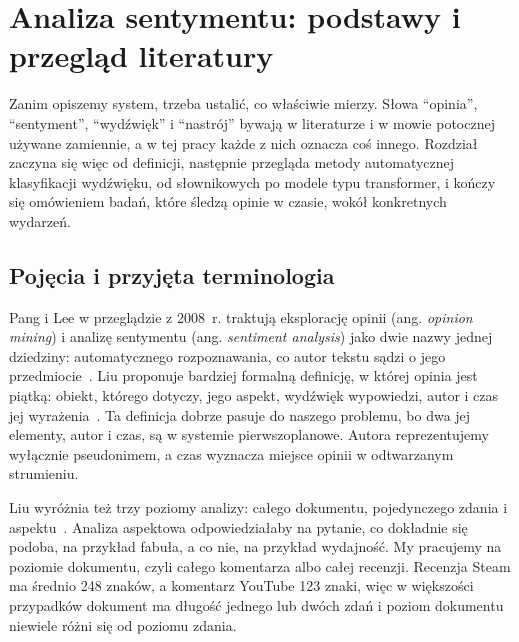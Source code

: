 \chapter{Analiza sentymentu: podstawy i przegląd literatury}
\label{chap:sentiment}


Zanim opiszemy system, trzeba ustalić, co właściwie mierzy.
Słowa \enquote{opinia}, \enquote{sentyment}, \enquote{wydźwięk} i \enquote{nastrój} bywają w literaturze i w mowie potocznej używane zamiennie, a w tej pracy każde z nich oznacza coś innego.
Rozdział zaczyna się więc od definicji, następnie przegląda metody automatycznej klasyfikacji wydźwięku, od słownikowych po modele typu transformer, i kończy się omówieniem badań, które śledzą opinie w czasie, wokół konkretnych wydarzeń.

\section{Pojęcia i przyjęta terminologia}
\label{sec:sentiment-terms}

Pang i Lee w przeglądzie z 2008~r. traktują eksplorację opinii (ang. \textit{opinion mining}) i analizę sentymentu (ang. \textit{sentiment analysis}) jako dwie nazwy jednej dziedziny: automatycznego rozpoznawania, co autor tekstu sądzi o jego przedmiocie~\cite{pang2008opinion}.
Liu proponuje bardziej formalną definicję, w której opinia jest piątką: obiekt, którego dotyczy, jego aspekt, wydźwięk wypowiedzi, autor i czas jej wyrażenia~\cite{liu2015sentiment}.
Ta definicja dobrze pasuje do naszego problemu, bo dwa jej elementy, autor i czas, są w systemie pierwszoplanowe.
Autora reprezentujemy wyłącznie pseudonimem, a czas wyznacza miejsce opinii w odtwarzanym strumieniu.

Liu wyróżnia też trzy poziomy analizy: całego dokumentu, pojedynczego zdania i aspektu~\cite{liu2015sentiment}.
Analiza aspektowa odpowiedziałaby na pytanie, co dokładnie się podoba, na przykład fabuła, a co nie, na przykład wydajność.
My pracujemy na poziomie dokumentu, czyli całego komentarza albo całej recenzji.
Recenzja Steam ma średnio 248 znaków, a komentarz YouTube 123 znaki, więc w większości przypadków dokument ma długość jednego lub dwóch zdań i poziom dokumentu niewiele różni się od poziomu zdania.

